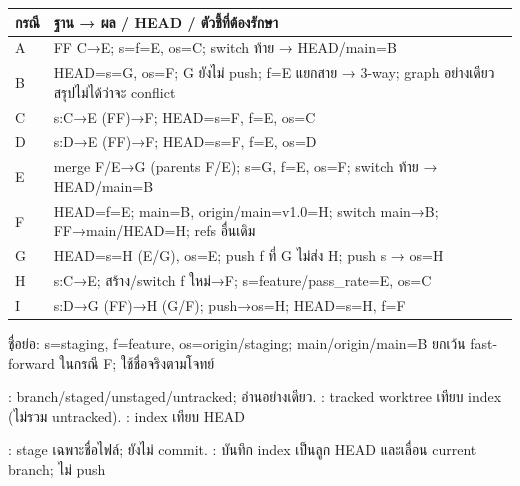 {\smalltable\begin{tabularx}{\linewidth}{|C{4mm}|Y|}\hline
{}กรณี & ฐาน → ผล / HEAD / ตัวชี้ที่ต้องรักษา\\\hline
A & FF C→E; s=f=E, os=C; switch ท้าย → HEAD/main=B\\\hline
B & HEAD=s=G, os=F; G ยังไม่ push; f=E แยกสาย → 3-way; graph อย่างเดียวสรุปไม่ได้ว่าจะ conflict\\\hline
C & s:C→E (FF)→F; HEAD=s=F, f=E, os=C\\\hline
D & s:D→E (FF)→F; HEAD=s=F, f=E, os=D\\\hline
E & merge F/E→G (parents F/E); s=G, f=E, os=F; switch ท้าย → HEAD/main=B\\\hline
F & HEAD=f=E; main=B, origin/main=v1.0=H; switch main→B; FF→main/HEAD=H; refs อื่นเดิม\\\hline
G & HEAD=s=H (E/G), os=E; push f ที่ G ไม่ส่ง H; push s → os=H\\\hline
H & s:C→E; สร้าง/switch f ใหม่→F; s=feature/pass\_rate=E, os=C\\\hline
I & s:D→G (FF)→H (G/F); push→os=H; HEAD=s=H, f=F\\\hline
\end{tabularx}}
\k{ชื่อย่อ}: s=staging, f=feature, os=origin/staging; main/origin/main=B ยกเว้น fast-forward ในกรณี F; ใช้ชื่อจริงตามโจทย์
\begin{center}\end{center}
\par{}: branch/staged/unstaged/untracked; อ่านอย่างเดียว. : tracked worktree เทียบ index (ไม่รวม untracked). : index เทียบ HEAD
\par{}: stage เฉพาะชื่อไฟล์; ยังไม่ commit. : บันทึก index เป็นลูก HEAD และเลื่อน current branch; ไม่ push
